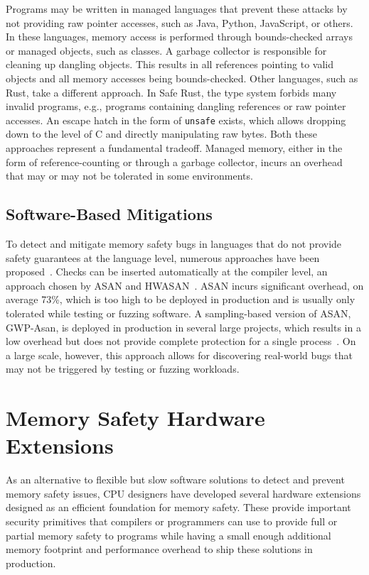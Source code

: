 Programs may be written in managed languages that prevent these attacks by not providing raw pointer accesses, such as Java, Python, JavaScript, or others.
In these languages, memory access is performed through bounds-checked arrays or managed objects, such as classes.
A garbage collector is responsible for cleaning up dangling objects.
This results in all references pointing to valid objects and all memory accesses being bounds-checked.
Other languages, such as Rust, take a different approach.
In Safe Rust, the type system forbids many invalid programs, e.g., programs containing dangling references or raw pointer accesses.
An escape hatch in the form of \texttt{unsafe} exists, which allows dropping down to the level of C and directly manipulating raw bytes.
Both these approaches represent a fundamental tradeoff.
Managed memory, either in the form of reference-counting or through a garbage collector, incurs an overhead that may or may not be tolerated in some environments.

\subsection{Software-Based Mitigations}
\label{subsec:software-based-mitigations}

To detect and mitigate memory safety bugs in languages that do not provide safety guarantees at the language level, numerous approaches have been proposed~\cite{serebryany2012addresssanitizer,serebryany2023gwp,nethercote2007valgrind,serebryany2018memory}.
Checks can be inserted automatically at the compiler level, an approach chosen by \ac{ASAN} and \ac{HWASAN}~\cite{serebryany2012addresssanitizer,serebryany2018memory}.
\Ac{ASAN} incurs significant overhead, on average 73\%, which is too high to be deployed in production and is usually only tolerated while testing or fuzzing software.
A sampling-based version of \ac{ASAN}, GWP-Asan, is deployed in production in several large projects, which results in a low overhead but does not provide complete protection for a single process~\cite{serebryany2023gwp}.
On a large scale, however, this approach allows for discovering real-world bugs that may not be triggered by testing or fuzzing workloads.

\section{Memory Safety Hardware Extensions}
\label{sec:memory-safety-hardware-extensions}

As an alternative to flexible but slow software solutions to detect and prevent memory safety issues, CPU designers have developed several hardware extensions designed as an efficient foundation for memory safety.
These provide important security primitives that compilers or programmers can use to provide full or partial memory safety to programs while having a small enough additional memory footprint and performance overhead to ship these solutions in production.

